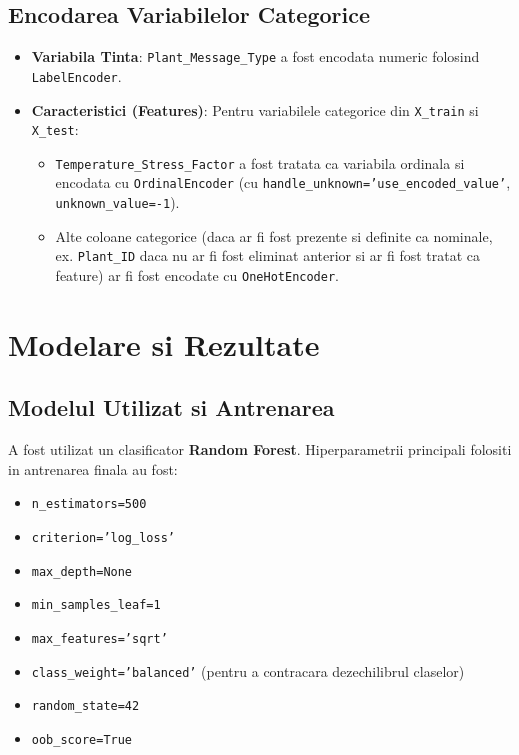 \documentclass[11pt, a4paper]{article}
\begin{document}
\subsection{Encodarea Variabilelor Categorice}
\sloppy
\begin{itemize}[noitemsep, topsep=1pt]
    \item \textbf{Variabila Tinta}: \texttt{Plant\_Message\_Type} a fost encodata numeric folosind \texttt{LabelEncoder}.
    \item \textbf{Caracteristici (Features)}: Pentru variabilele categorice din \texttt{X\_train} si \texttt{X\_test}:
        \begin{itemize}[noitemsep, topsep=0pt]
            \item \texttt{Temperature\_Stress\_Factor} a fost tratata ca variabila ordinala si encodata cu \texttt{OrdinalEncoder} (cu \texttt{handle\_unknown='use\_encoded\_value'}, \texttt{unknown\_value=-1}).
            \item Alte coloane categorice (daca ar fi fost prezente si definite ca nominale, ex. \texttt{Plant\_ID} daca nu ar fi fost eliminat anterior si ar fi fost tratat ca feature) ar fi fost encodate cu \texttt{OneHotEncoder}.
        \end{itemize}
\end{itemize}

\section{Modelare si Rezultate}
\subsection{Modelul Utilizat si Antrenarea}
A fost utilizat un clasificator \textbf{Random Forest}. Hiperparametrii principali folositi in antrenarea finala au fost:
\begin{itemize}[noitemsep, topsep=1pt]
    \item \texttt{n\_estimators=500}
    \item \texttt{criterion='log\_loss'}
    \item \texttt{max\_depth=None}
    \item \texttt{min\_samples\_leaf=1}
    \item \texttt{max\_features='sqrt'}
    \item \texttt{class\_weight='balanced'} (pentru a contracara dezechilibrul claselor)
    \item \texttt{random\_state=42}
    \item \texttt{oob\_score=True}
\end{itemize}
\end{document}
